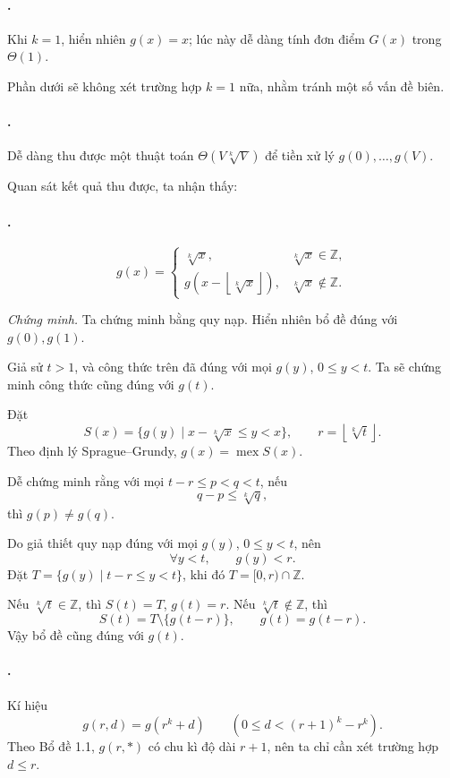 \documentclass[11pt]{article}
\begin{document}
\paragraph{.}
Khi \(k=1\), hiển nhiên \(g(x)=x\); lúc này dễ dàng tính đơn điểm \(G(x)\)
trong \(\Theta(1)\).

Phần dưới sẽ không xét trường hợp \(k=1\) nữa, nhằm tránh một số vấn đề biên.

\paragraph{.}
Dễ dàng thu được một thuật toán \(\Theta(V\sqrt[k]{V})\) để tiền xử lý
\(g(0),\ldots,g(V)\).

Quan sát kết quả thu được, ta nhận thấy:

\paragraph{.}
\[
g(x)=
\begin{cases}
\sqrt[k]{x}, & \sqrt[k]{x}\in\mathbb Z,\\
g\!\left(x-\left\lfloor\sqrt[k]{x}\right\rfloor\right),
  & \sqrt[k]{x}\notin\mathbb Z.
\end{cases}
\]

\emph{Chứng minh.}
Ta chứng minh bằng quy nạp. Hiển nhiên bổ đề đúng với \(g(0),g(1)\).

Giả sử \(t>1\), và công thức trên đã đúng với mọi \(g(y)\), \(0\le y<t\). Ta
sẽ chứng minh công thức cũng đúng với \(g(t)\).

Đặt
\[
  S(x)=\{g(y)\mid x-\sqrt[k]{x}\le y<x\},\qquad
  r=\left\lfloor\sqrt[k]{t}\right\rfloor.
\]
Theo định lý Sprague--Grundy, \(g(x)=\operatorname{mex} S(x)\).

Dễ chứng minh rằng với mọi \(t-r\le p<q<t\), nếu
\[
  q-p\le \sqrt[k]{q},
\]
thì \(g(p)\ne g(q)\).

Do giả thiết quy nạp đúng với mọi \(g(y)\), \(0\le y<t\), nên
\[
  \forall y<t,\qquad g(y)<r.
\]
Đặt \(T=\{g(y)\mid t-r\le y<t\}\), khi đó \(T=[0,r)\cap\mathbb Z\).

Nếu \(\sqrt[k]{t}\in\mathbb Z\), thì \(S(t)=T\), \(g(t)=r\). Nếu
\(\sqrt[k]{t}\notin\mathbb Z\), thì
\[
  S(t)=T\setminus\{g(t-r)\},\qquad g(t)=g(t-r).
\]
Vậy bổ đề cũng đúng với \(g(t)\).

\paragraph{.}
Kí hiệu
\[
  g(r,d)=g(r^k+d)\qquad \left(0\le d<(r+1)^k-r^k\right).
\]
Theo Bổ đề 1.1, \(g(r,*)\) có chu kì độ dài \(r+1\), nên ta chỉ cần xét
trường hợp \(d\le r\).
\end{document}
